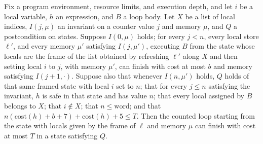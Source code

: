 \begin{theorem}
\label{Light.Ends.forScratch}
\leanok
{}
Fix a program environment, resource limits, and execution depth, and let $i$ be a local
variable, $h$ an expression, and $B$ a loop body. Let $X$ be a list of local indices,
$I(j,\mu)$ an invariant on a counter value $j$ and memory $\mu$, and $Q$ a postcondition
on states. Suppose $I(0,\mu)$ holds; for every $j<n$, every local store $\ell'$, and
every memory $\mu'$ satisfying $I(j,\mu')$, executing $B$ from the state whose locals
are the frame of the list obtained by refreshing $\ell'$ along $X$ and then setting
local $i$ to $j$, with memory $\mu'$, can finish with cost at most $b$ and memory
satisfying $I(j+1,\cdot)$. Suppose also that whenever $I(n,\mu')$ holds, $Q$ holds of
that same framed state with local $i$ set to $n$; that for every $j\le n$ satisfying the
invariant, $h$ is safe in that state and has value $n$; that every local assigned by $B$
belongs to $X$; that $i\notin X$; that $n\le\mathrm{word}$; and that
$n(\mathrm{cost}(h)+b+7)+\mathrm{cost}(h)+5\le T$. Then the counted loop starting from
the state with locals given by the frame of $\ell$ and memory $\mu$ can finish with cost
at most $T$ in a state satisfying $Q$.
\end{theorem}
